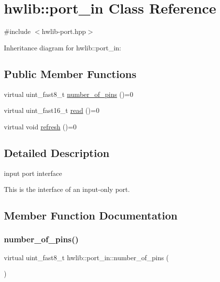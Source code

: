 \hypertarget{classhwlib_1_1port__in}{}\section{hwlib\+:\+:port\+\_\+in Class Reference}
\label{classhwlib_1_1port__in}


{\ttfamily \#include $<$hwlib-\/port.\+hpp$>$}



Inheritance diagram for hwlib\+:\+:port\+\_\+in\+:
\subsection*{Public Member Functions}
\begin{DoxyCompactItemize}
\item 
virtual uint\+\_\+fast8\+\_\+t \hyperlink{classhwlib_1_1port__in_a3498fc0158e1e460a00d671df629fe22}{number\+\_\+of\+\_\+pins} ()=0
\item 
virtual uint\+\_\+fast16\+\_\+t \hyperlink{classhwlib_1_1port__in_aa3aa277f9448c3ee493c56f05beb2ddb}{read} ()=0
\item 
virtual void \hyperlink{classhwlib_1_1port__in_a5d409eee35b766c844f7229fbe010545}{refresh} ()=0
\end{DoxyCompactItemize}


\subsection{Detailed Description}
input port interface

This is the interface of an input-\/only port. 

\subsection{Member Function Documentation}
\mbox{\label{classhwlib_1_1port__in_a3498fc0158e1e460a00d671df629fe22}} 
\subsubsection{\texorpdfstring{number\+\_\+of\+\_\+pins()}{number\_of\_pins()}}
{\footnotesize\ttfamily virtual uint\+\_\+fast8\+\_\+t hwlib\+::port\+\_\+in\+::number\+\_\+of\+\_\+pins (\begin{DoxyParamCaption}{ }\end{DoxyParamCaption})\hspace{0.3cm}{\ttfamily [pure virtual]}}





